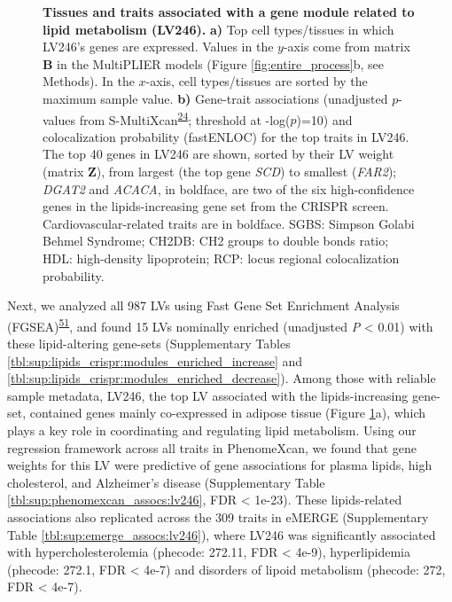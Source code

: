 \documentclass[
  a4paper,
]{article}
\begin{document}
\begin{figure}
\hypertarget{fig:lv246}{%
\centering

\caption{\textbf{Tissues and traits associated with a gene module related to lipid metabolism (LV246).}
\textbf{a)} Top cell types/tissues in which LV246's genes are expressed.
Values in the \(y\)-axis come from matrix \(\mathbf{B}\) in the MultiPLIER models (Figure \ref{fig:entire_process}b, see Methods).
In the \(x\)-axis, cell types/tissues are sorted by the maximum sample value.
\textbf{b)} Gene-trait associations (unadjusted \(p\)-values from S-MultiXcan\textsuperscript{\protect\hyperlink{ref-1FFzCXo1s}{24}}; threshold at -log(\(p\))=10) and colocalization probability (fastENLOC) for the top traits in LV246.
The top 40 genes in LV246 are shown, sorted by their LV weight (matrix \(\mathbf{Z}\)), from largest (the top gene \emph{SCD}) to smallest (\emph{FAR2});
\emph{DGAT2} and \emph{ACACA}, in boldface, are two of the six high-confidence genes in the lipids-increasing gene set from the CRISPR screen.
Cardiovascular-related traits are in boldface.
SGBS: Simpson Golabi Behmel Syndrome;
CH2DB: CH2 groups to double bonds ratio;
HDL: high-density lipoprotein;
RCP: locus regional colocalization probability.
}\label{fig:lv246}
}
\end{figure}

Next, we analyzed all 987 LVs using Fast Gene Set Enrichment Analysis (FGSEA)\textsuperscript{\protect\hyperlink{ref-Z8WXLD67}{51}}, and found 15 LVs nominally enriched (unadjusted \emph{P} \textless{} 0.01) with these lipid-altering gene-sets (Supplementary Tables \ref{tbl:sup:lipids_crispr:modules_enriched_increase} and \ref{tbl:sup:lipids_crispr:modules_enriched_decrease}).
Among those with reliable sample metadata, LV246, the top LV associated with the lipids-increasing gene-set, contained genes mainly co-expressed in adipose tissue (Figure \ref{fig:lv246}a), which plays a key role in coordinating and regulating lipid metabolism.
Using our regression framework across all traits in PhenomeXcan, we found that gene weights for this LV were predictive of gene associations for plasma lipids, high cholesterol, and Alzheimer's disease (Supplementary Table \ref{tbl:sup:phenomexcan_assocs:lv246}, FDR \textless{} 1e-23).
These lipids-related associations also replicated across the 309 traits in eMERGE (Supplementary Table \ref{tbl:sup:emerge_assocs:lv246}), where LV246 was significantly associated with hypercholesterolemia (phecode: 272.11, FDR \textless{} 4e-9), hyperlipidemia (phecode: 272.1, FDR \textless{} 4e-7) and disorders of lipoid metabolism (phecode: 272, FDR \textless{} 4e-7).
\end{document}
